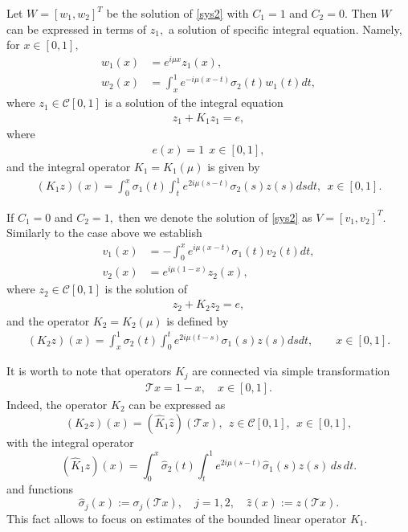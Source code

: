 \documentclass[11pt]{amsart}
\theoremstyle{plain}
\theoremstyle{definition}
\theoremstyle{remark}
\numberwithin{equation}{section}
\begin{document}
Let $W=[w_1,w_2]^T$ be the solution of \eqref{sys2} with
$C_1=1$ and $C_2=0$. Then $W$ can be expressed in terms of $z_1,$ a solution of specific integral equation. Namely,
for $x\in [0,1],$
\begin{align}
w_1(x)&=e^{i\mu x}z_1(x),\\
w_2(x)&=\int_x^1 e^{-i \mu (x-t)}\sigma_2(t)w_1(t)dt,\label{w2}
\end{align}
where $z_1 \in \mathcal{C}[0,1]$ is a solution of the integral equation
\begin{align}\label{K1E}
z_1+K_1z_1=e,
\end{align}
where
\begin{align}
e(x)=1 \ \ x\in [0,1],
\end{align}
and the integral operator $K_1=K_1(\mu)$ is given by
\begin{align}\label{Op1}
(K_1z)(x)=\int_0^x \sigma_1(t)\int_t^1e^{2i\mu(s-t)}\sigma_2(s)z(s)dsdt, \ \ x\in[0,1].
\end{align}

If $C_1=0$ and $C_2=1,$ then we denote the solution of \eqref{sys2} as $V=[v_1,v_2]^T$.
Similarly to the  case above we establish
\begin{align}
v_1(x)&= - \int_0^x e^{i \mu (x-t)}\sigma_1(t)v_2(t)dt,\label{v1}\\
v_2(x)&=e^{i\mu(1-x)}z_2(x),
\end{align}
where $z_2\in \mathcal{C}[0,1]$ is the solution of
\begin{align}\label{K2E}
z_2+K_2z_2=e,
\end{align}
and the operator $K_2=K_2(\mu)$ is defined by
\begin{align}\label{Op2}
(K_2z)(x)=\int_x^1 \sigma_2(t)\int_0^te^{2i\mu(t-s)}\sigma_1(s)z(s)dsdt, \qquad x\in[0,1].
\end{align}

It is worth to note that operators $K_j$ are connected via simple transformation
\begin{align}\label{simT}
\mathcal{T}x=1-x,\quad x\in [0,1].
\end{align}
Indeed, the operator $K_2$ can be expressed as
\begin{equation}\label{Con}
(K_{2}z)(x)
=(\hat{K}_{1}\hat{z})(\mathcal{T}x),\ \ z\in\mathcal{C}[0,1], \ \  x\in [0,1],
\end{equation}
with the integral operator
\[
(\hat{K}_1z)(x)=\int_0^x \hat{\sigma}_2(t)
\int_t^1 e^{2i\mu(s-t)}\hat{\sigma}_1(s)z(s)\,ds\,dt.
\]
and functions
\[
\hat{\sigma}_j(x):=\sigma_j(\mathcal{T}x),\quad j=1,2, \quad\hat{z}(x):=z(\mathcal{T}x).
\]
This fact allows to focus on estimates of the bounded linear operator $K_1$.
\end{document}
